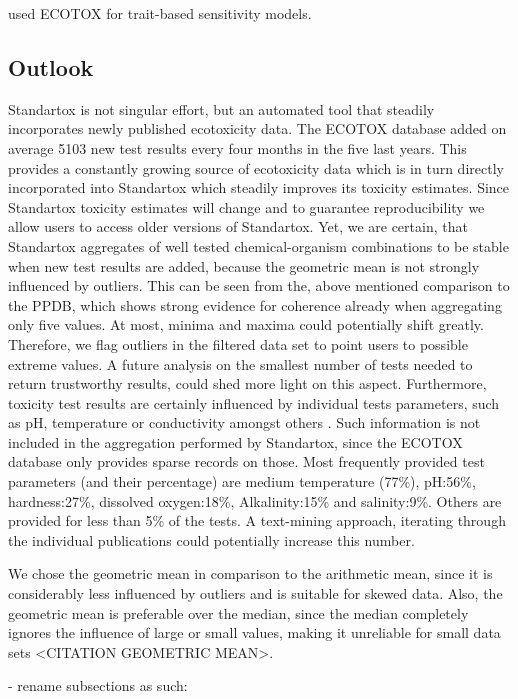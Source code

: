 \citet{vandenberg_modeling_2019} used ECOTOX for trait-based sensitivity models. 


\subsection{Outlook}
Standartox is not singular effort, but an automated tool that steadily incorporates newly published ecotoxicity data. The ECOTOX database added on average 5103 new test results every four months in the five last years. This provides a constantly growing source of ecotoxicity data which is in turn directly incorporated into Standartox which steadily improves its toxicity estimates. Since Standartox toxicity estimates will change and to guarantee reproducibility we allow users to access older versions of Standartox. Yet, we are certain, that Standartox aggregates of well tested chemical-organism combinations to be stable when new test results are added, because the geometric mean is not strongly influenced by outliers. This can be seen from the, above mentioned comparison to the PPDB, which shows strong evidence for coherence already when aggregating only five values. At most, minima and maxima could potentially shift greatly. Therefore, we flag outliers in the filtered data set to point users to possible extreme values. A future analysis on the smallest number of tests needed to return trustworthy results, could shed more light on this aspect. Furthermore, toxicity test results are certainly influenced by individual tests parameters, such as pH, temperature or conductivity amongst others \citep{rosenkrantz_influence_2013, li_temperature_2011}. Such information is not included in the aggregation performed by Standartox, since the ECOTOX database only provides sparse records on those. Most frequently provided test parameters (and their percentage) are medium temperature (77\%), pH:56\%, hardness:27\%, dissolved oxygen:18\%, Alkalinity:15\% and salinity:9\%. Others are provided for less than 5\% of the tests. A text-mining approach, iterating through the individual publications could potentially increase this number.

We chose the geometric mean in comparison to the arithmetic mean, since it is considerably less influenced by outliers and is suitable for skewed data. Also, the geometric mean is preferable over the median, since the median completely ignores the influence of large or small values, making it unreliable for small data sets <CITATION GEOMETRIC MEAN>.


\iffalse
- rename subsections as such:
    
